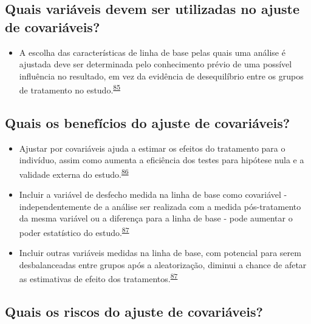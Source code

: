 \documentclass[
]{book}
\providecommand{\tightlist}{%
  \setlength{\itemsep}{0pt}\setlength{\parskip}{0pt}}
\begin{document}
\hypertarget{quais-variuxe1veis-devem-ser-utilizadas-no-ajuste-de-covariuxe1veis}{%
\subsection{Quais variáveis devem ser utilizadas no ajuste de covariáveis?}\label{quais-variuxe1veis-devem-ser-utilizadas-no-ajuste-de-covariuxe1veis}}

\begin{itemize}
\tightlist
\item
  A escolha das características de linha de base pelas quais uma análise é ajustada deve ser determinada pelo conhecimento prévio de uma possível influência no resultado, em vez da evidência de desequilíbrio entre os grupos de tratamento no estudo.\textsuperscript{\protect\hyperlink{ref-roberts1999}{85}}
\end{itemize}

\hypertarget{quais-os-benefuxedcios-do-ajuste-de-covariuxe1veis}{%
\subsection{Quais os benefícios do ajuste de covariáveis?}\label{quais-os-benefuxedcios-do-ajuste-de-covariuxe1veis}}

\begin{itemize}
\item
  Ajustar por covariáveis ajuda a estimar os efeitos do tratamento para o indivíduo, assim como aumenta a eficiência dos testes para hipótese nula e a validade externa do estudo.\textsuperscript{\protect\hyperlink{ref-Hauck1998}{86}}
\item
  Incluir a variável de desfecho medida na linha de base como covariável - independentemente de a análise ser realizada com a medida pós-tratamento da mesma variável ou a diferença para a linha de base - pode aumentar o poder estatístico do estudo.\textsuperscript{\protect\hyperlink{ref-Kahan2014}{87}}
\item
  Incluir outras variáveis medidas na linha de base, com potencial para serem desbalanceadas entre grupos após a aleatorização, diminui a chance de afetar as estimativas de efeito dos tratamentos.\textsuperscript{\protect\hyperlink{ref-Kahan2014}{87}}
\end{itemize}

\hypertarget{quais-os-riscos-do-ajuste-de-covariuxe1veis}{%
\subsection{Quais os riscos do ajuste de covariáveis?}\label{quais-os-riscos-do-ajuste-de-covariuxe1veis}}
\end{document}
